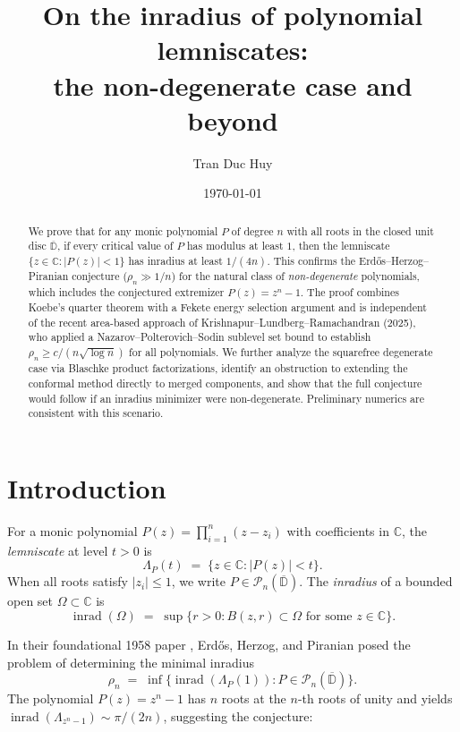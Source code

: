 \documentclass[11pt,a4paper]{amsart}
\title[Inradius of polynomial lemniscates]{On the inradius of polynomial lemniscates: \\
the non-degenerate case and beyond}
\author{Tran Duc Huy}
\date{\today}
\theoremstyle{definition}
\newcommand{\D}{\mathbb{D}}
\newcommand{\C}{\mathbb{C}}
\newcommand{\Pn}{\mathcal{P}_n}
\newcommand{\abs}[1]{\lvert #1 \rvert}
\newcommand{\inrad}{\operatorname{inrad}}
\begin{document}
\begin{abstract}
We prove that for any monic polynomial $P$ of degree $n$ with all roots in
the closed unit disc $\overline{\D}$, if every critical value of $P$ has
modulus at least $1$, then the lemniscate $\{z \in \C : \abs{P(z)} < 1\}$
has inradius at least $1/(4n)$.  This confirms the Erd\H{o}s--Herzog--Piranian
conjecture ($\rho_n \gg 1/n$) for the natural class of \emph{non-degenerate}
polynomials, which includes the conjectured extremizer $P(z) = z^n - 1$.
The proof combines Koebe's quarter theorem with a Fekete energy
selection argument and is independent of the recent area-based approach of
Krishnapur--Lundberg--Ramachandran (2025), who applied
a Nazarov--Polterovich--Sodin sublevel set bound to establish
$\rho_n \geq c/(n\sqrt{\log n})$ for all polynomials.
We further analyze the squarefree degenerate case via Blaschke product
factorizations, identify an obstruction to extending the conformal
method directly to merged components, and show that the full conjecture
would follow if an inradius minimizer were non-degenerate.
Preliminary numerics are consistent with this scenario.
\end{abstract}

\maketitle

\section{Introduction}

For a monic polynomial $P(z) = \prod_{i=1}^n (z - z_i)$ with coefficients in $\C$,
the \emph{lemniscate} at level $t > 0$ is
\[
  \Lambda_P(t) \;=\; \bigl\{z \in \C : \abs{P(z)} < t\bigr\}.
\]
When all roots satisfy $\abs{z_i} \leq 1$, we write
$P \in \Pn(\overline{\D})$.
The \emph{inradius} of a bounded open set $\Omega \subset \C$ is
\[
  \inrad(\Omega) \;=\; \sup\bigl\{r > 0 : B(z,r) \subset \Omega
  \text{ for some } z \in \C\bigr\}.
\]

In their foundational 1958 paper \cite{EHP58}, Erd\H{o}s, Herzog, and Piranian
posed the problem of determining the minimal inradius
\[
  \rho_n \;=\; \inf\bigl\{\inrad(\Lambda_P(1)) : P \in \Pn(\overline{\D})\bigr\}.
\]
The polynomial $P(z) = z^n - 1$ has $n$ roots at the $n$-th roots of unity
and yields $\inrad(\Lambda_{z^n-1}) \sim \pi/(2n)$, suggesting the conjecture:
\end{document}
